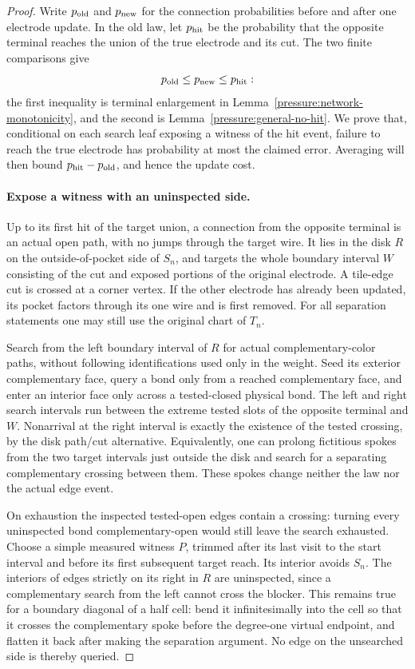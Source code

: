 \begin{proof}
Write $p_{\rm old}$ and $p_{\rm new}$ for the connection probabilities
before and after one electrode update.  In the old law, let
$p_{\rm hit}$ be the probability that the opposite terminal reaches
the union of the true electrode and its cut.  The two finite
comparisons give
\[
 p_{\rm old}\le p_{\rm new}\le p_{\rm hit}:
\]
the first inequality is terminal enlargement in
Lemma~\ref{pressure:network-monotonicity}, and the second is
Lemma~\ref{pressure:general-no-hit}.  We prove that, conditional
on each search leaf exposing a witness of the hit event, failure to
reach the true electrode has probability at most the claimed error.  Averaging will
then bound $p_{\rm hit}-p_{\rm old}$, and hence the update cost.

\paragraph{Expose a witness with an uninspected side.}
Up to its first hit of the target union, a connection from the opposite
terminal is an actual open path,
with no jumps through the target wire.  It lies in the disk $R$ on
the outside-of-pocket side of $S_n$, and targets the whole boundary
interval $W$ consisting of the cut and exposed portions of the
original electrode.  A tile-edge cut is crossed at a corner vertex.
If the other electrode has already been updated, its pocket factors
through its one wire and is first removed.  For all separation
statements one may still use the original chart of $T_n$.

Search from the left boundary interval of $R$ for actual
complementary-color paths, without following identifications used
only in the weight.  Seed its exterior complementary face, query a
bond only from a reached complementary face, and enter an interior
face only across a tested-closed physical bond.
The left and right search intervals run between
the extreme tested slots of the opposite terminal and $W$.
Nonarrival at the right interval is exactly the existence of the
tested crossing, by the disk path/cut alternative.  Equivalently,
one can prolong fictitious spokes from the two target intervals
just outside the disk and search for a separating complementary
crossing between them.  These spokes change neither the law nor
the actual edge event.

On exhaustion the inspected tested-open edges contain a crossing:
turning every uninspected bond complementary-open would still leave
the search exhausted.  Choose a simple measured witness $P$, trimmed
after its last visit to the start interval and before its first
subsequent target reach.  Its interior avoids
$S_n$.  The interiors of edges strictly on its right in $R$ are
uninspected, since a complementary search from the left cannot
cross the blocker.  This remains true for a boundary diagonal of a
half cell: bend it infinitesimally into the cell so that it crosses
the complementary spoke before the degree-one virtual endpoint,
and flatten it back after making the separation argument.  No edge
on the unsearched side is thereby queried.


\end{proof}

